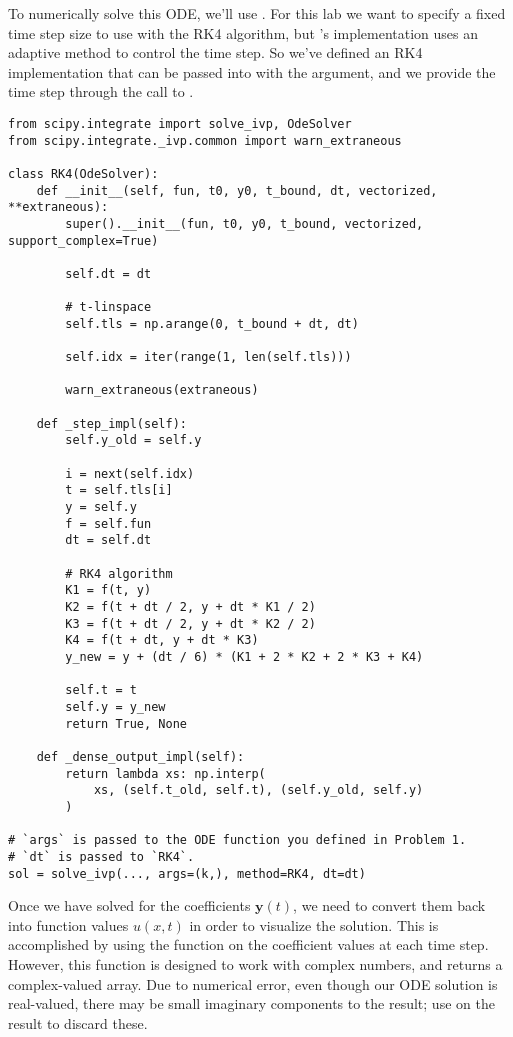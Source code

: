 \noindent To numerically solve this ODE, we'll use .
For this lab we want to specify a fixed time step size to use with the RK4 algorithm, but 's implementation uses an adaptive method to control the time step.
So we've defined an RK4 implementation that can be passed into  with the  argument, and we provide the time step  through the call to .
\begin{lstlisting}
from scipy.integrate import solve_ivp, OdeSolver
from scipy.integrate._ivp.common import warn_extraneous

class RK4(OdeSolver):
    def __init__(self, fun, t0, y0, t_bound, dt, vectorized, **extraneous):
        super().__init__(fun, t0, y0, t_bound, vectorized, support_complex=True)

        self.dt = dt

        # t-linspace
        self.tls = np.arange(0, t_bound + dt, dt)

        self.idx = iter(range(1, len(self.tls)))

        warn_extraneous(extraneous)

    def _step_impl(self):
        self.y_old = self.y

        i = next(self.idx)
        t = self.tls[i]
        y = self.y
        f = self.fun
        dt = self.dt

        # RK4 algorithm
        K1 = f(t, y)
        K2 = f(t + dt / 2, y + dt * K1 / 2)
        K3 = f(t + dt / 2, y + dt * K2 / 2)
        K4 = f(t + dt, y + dt * K3)
        y_new = y + (dt / 6) * (K1 + 2 * K2 + 2 * K3 + K4)

        self.t = t
        self.y = y_new
        return True, None

    def _dense_output_impl(self):
        return lambda xs: np.interp(
            xs, (self.t_old, self.t), (self.y_old, self.y)
        )

# `args` is passed to the ODE function you defined in Problem 1.
# `dt` is passed to `RK4`.
sol = solve_ivp(..., args=(k,), method=RK4, dt=dt)
\end{lstlisting}

Once we have solved for the coefficients \(\mathbf{y}(t)\), we need to convert them back into function values \(u(x,t)\) in order to visualize the solution.
This is accomplished by using the  function on the coefficient values at each time step.
However, this function is designed to work with complex numbers, and returns a complex-valued array.
Due to numerical error, even though our ODE solution is real-valued, there may be small imaginary components to the result; use  on the result to discard these.

